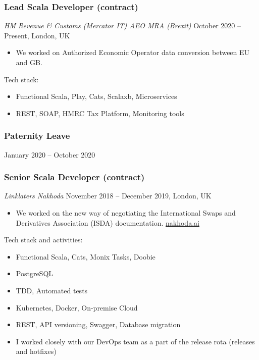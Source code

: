 \documentclass[
]{rss}
\providecommand{\tightlist}{%
  \setlength{\itemsep}{0pt}\setlength{\parskip}{0pt}}
\begin{document}
\begin{resume}
\hypertarget{lead-scala-developer-contract}{%
\subsubsection{Lead Scala Developer
(contract)}\label{lead-scala-developer-contract}}

\emph{HM Revenue \& Customs (Mercator IT) \textbar{} AEO MRA (Brexit)}
October 2020 -- Present, London, UK

\begin{itemize}
\tightlist
\item
  We worked on Authorized Economic Operator data conversion between EU
  and GB.
\end{itemize}

Tech stack:

\begin{itemize}
\tightlist
\item
  Functional Scala, Play, Cats, Scalaxb, Microservices
\item
  REST, SOAP, HMRC Tax Platform, Monitoring tools
\end{itemize}

\hypertarget{paternity-leave}{%
\subsubsection{Paternity Leave}\label{paternity-leave}}

January 2020 -- October 2020

\hypertarget{senior-scala-developer-contract}{%
\subsubsection{Senior Scala Developer
(contract)}\label{senior-scala-developer-contract}}

\emph{Linklaters \textbar{} Nakhoda} November 2018 -- December 2019,
London, UK

\begin{itemize}
\tightlist
\item
  We worked on the new way of negotiating the International Swaps and
  Derivatives Association (ISDA) documentation.
  \href{https://nakhoda.ai}{nakhoda.ai}
\end{itemize}

Tech stack and activities:

\begin{itemize}
\tightlist
\item
  Functional Scala, Cats, Monix Tasks, Doobie
\item
  PostgreSQL
\item
  TDD, Automated tests
\item
  Kubernetes, Docker, On-premise Cloud
\item
  REST, API versioning, Swagger, Database migration
\item
  I worked closely with our DevOps team as a part of the release rota
  (releases and hotfixes)
\end{itemize}


\end{resume}
\end{document}
